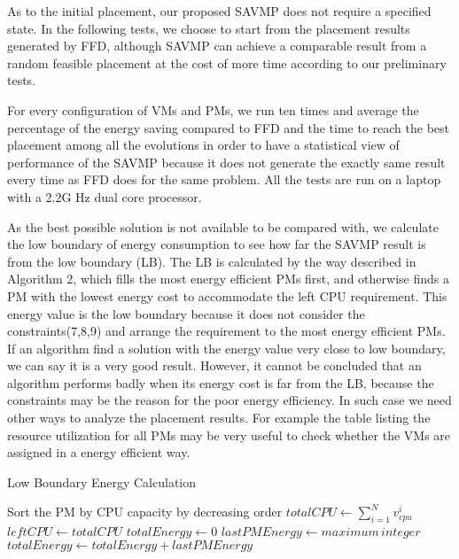 \documentclass[10pt, conference, compsocconf]{IEEEtran}
\begin{document}
As to the initial placement, our proposed SAVMP does not require a specified
state. In the following tests, we choose to start from the placement results
generated by FFD, although SAVMP can achieve a comparable result from a random
feasible placement at the cost of more time according to our preliminary
tests.

For every configuration of VMs and PMs, we run ten times and average the 
percentage of the energy saving compared to FFD and the time to reach the best
placement among all the evolutions in order to have a statistical view of performance of the SAVMP
because it does not generate the exactly same result every time as FFD does for
the same problem. All the tests are run on a laptop with a 2.2G Hz dual core
processor.

As the best possible solution is not available to be compared with, we calculate
the low boundary of energy consumption to see how far the SAVMP result is from
the low boundary (LB). The LB is calculated by the way described in Algorithm 2,
which fills the most energy efficient PMs first, and otherwise finds a PM with
the lowest energy cost to accommodate the left CPU requirement. This energy
value is the low boundary because it does not consider the
constraints(7,8,9) and arrange the requirement to the most energy efficient PMs.
If an algorithm find a solution with the energy value very close to low boundary, we can say it is a very good result. However, it cannot
be concluded that an algorithm performs badly when its energy cost is far from
the LB, because the constraints may be the reason for the poor energy
efficiency. In such case we need other ways to analyze the placement results.
For example the table listing the resource utilization for all PMs may be very
useful to check whether the VMs are assigned in a energy efficient way.

\begin{algorithm}
\SetAlgoLined
\LinesNumbered
\caption{Low Boundary Energy Calculation}
	Sort the PM by CPU capacity by decreasing order \;
	$totalCPU\leftarrow \sum_{i=1}^Nv_{cpu}^i $ \;
	$leftCPU\leftarrow totalCPU$\;
	$totalEnergy\leftarrow 0$ \;
	$lastPMEnergy\leftarrow maximum\, integer$ \;	
	$totalEnergy\leftarrow totalEnergy + lastPMEnergy$ \;
\end{algorithm}
\end{document}
